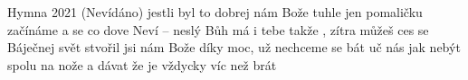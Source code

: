 \begin{TEXT}{Hymna 2021 (Nevídáno)}
\SLOKA {} jestli byl to dobrej \NL
{} nám Bože  tuhle \NL
jen pomaličku začínáme \NL
a  se co  dove\NL
\REFREN Neví – neslý \NL
{} Bůh má  i tebe \NL
takže , zítra \NL
{} můžeš  ces se \NL
\SLOKA Báječnej svět stvořil jsi nám Bože\NL
díky moc, už nechceme se bát\NL
uč nás jak nebýt spolu na nože\NL
a dávat že je vždycky víc než brát\NL
\end{TEXT}